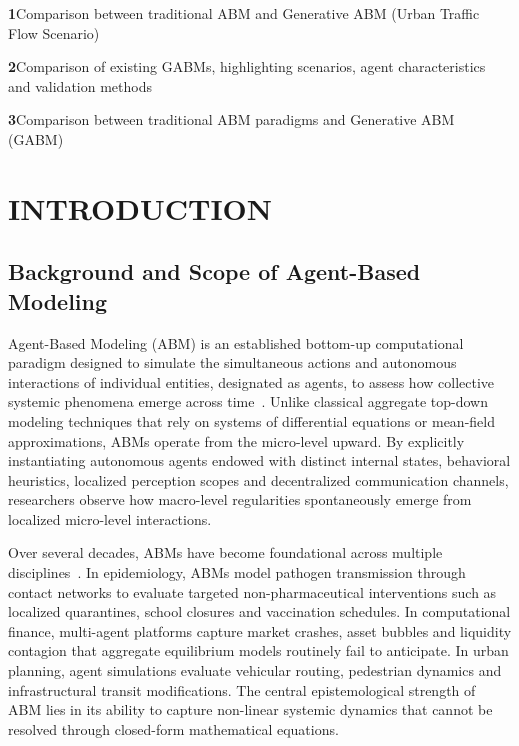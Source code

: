 \documentclass[12pt,a4paper]{report}
\begin{document}
\noindent\textbf{1}\quad Comparison between traditional ABM and Generative ABM (Urban Traffic Flow Scenario)\dotfill\pageref{tab:table1_traffic}\par
\vspace{8pt}
\noindent\textbf{2}\quad Comparison of existing GABMs, highlighting scenarios, agent characteristics and validation methods\dotfill\pageref{tab:table2_gabms}\par
\vspace{8pt}
\noindent\textbf{3}\quad Comparison between traditional ABM paradigms and Generative ABM (GABM)\dotfill\pageref{tab:table3_comparison}\par

\clearpage




\chapter{INTRODUCTION}
\label{chap:intro}

\section{Background and Scope of Agent-Based Modeling}
\label{sec:background}

Agent-Based Modeling (ABM) is an established bottom-up computational paradigm designed to simulate the simultaneous actions and autonomous interactions of individual entities, designated as agents, to assess how collective systemic phenomena emerge across time~\cite{bonabeau2002agent,macal2010tutorial}. Unlike classical aggregate top-down modeling techniques that rely on systems of differential equations or mean-field approximations, ABMs operate from the micro-level upward. By explicitly instantiating autonomous agents endowed with distinct internal states, behavioral heuristics, localized perception scopes and decentralized communication channels, researchers observe how macro-level regularities spontaneously emerge from localized micro-level interactions.

Over several decades, ABMs have become foundational across multiple disciplines~\cite{axtell2002why}. In epidemiology, ABMs model pathogen transmission through contact networks to evaluate targeted non-pharmaceutical interventions such as localized quarantines, school closures and vaccination schedules. In computational finance, multi-agent platforms capture market crashes, asset bubbles and liquidity contagion that aggregate equilibrium models routinely fail to anticipate. In urban planning, agent simulations evaluate vehicular routing, pedestrian dynamics and infrastructural transit modifications. The central epistemological strength of ABM lies in its ability to capture non-linear systemic dynamics that cannot be resolved through closed-form mathematical equations.
\end{document}
